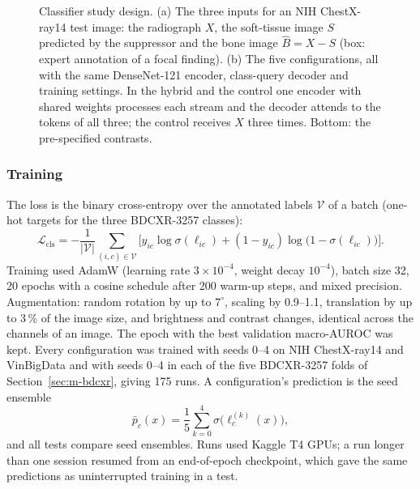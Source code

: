 \begin{figure}[!t]
\centering
{}
\caption{Classifier study design. (a) The three inputs for an NIH ChestX-ray14 test image: the radiograph $X$, the soft-tissue image $S$
predicted by the suppressor and the bone image $\hat B=X-S$ (box: expert annotation of a focal finding). (b) The five configurations, all
with the same DenseNet-121 encoder, class-query decoder and training settings. In the hybrid and the control one encoder with shared
weights processes each stream and the decoder attends to the tokens of all three; the control receives $X$ three times. Bottom: the
pre-specified contrasts.}
\label{fig:cls_design}
\end{figure}

\subsubsection{Training}
The loss is the binary cross-entropy over the annotated labels $\mathcal{V}$ of a batch (one-hot targets for the three BDCXR-3257 classes):
\begin{equation}
\mathcal{L}_{\mathrm{cls}}=-\frac{1}{|\mathcal{V}|}\sum_{(i,c)\in\mathcal{V}}\Big[y_{ic}\log\sigma(\ell_{ic})+(1-y_{ic})\log\big(1-\sigma(\ell_{ic})\big)\Big].
\label{eq:bce}
\end{equation}
Training used AdamW \cite{loshchilov2019adamw} (learning rate $3\times10^{-4}$, weight decay $10^{-4}$), batch size 32, 20 epochs with a
cosine schedule after 200 warm-up steps, and mixed precision. Augmentation: random rotation by up to $7^\circ$, scaling by 0.9--1.1,
translation by up to 3\,\% of the image size, and brightness and contrast changes, identical across the channels of an image. The epoch with
the best validation macro-AUROC was kept. Every configuration was trained with seeds 0--4 on NIH ChestX-ray14 and VinBigData and with seeds
0--4 in each of the five BDCXR-3257 folds of Section~\ref{sec:m-bdcxr}, giving 175 runs. A configuration's prediction is the seed ensemble
\begin{equation}
\bar p_c(x)=\frac15\sum_{k=0}^{4}\sigma\big(\ell^{(k)}_c(x)\big),
\label{eq:seedens}
\end{equation}
and all tests compare seed ensembles. Runs used Kaggle T4 GPUs; a run longer than one session resumed from an end-of-epoch checkpoint, which
gave the same predictions as uninterrupted training in a test.

